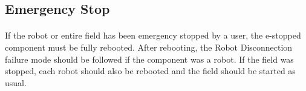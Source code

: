 \documentclass[11pt]{article}
\begin{document}
\subsection{Emergency Stop}
\paragraph{}
If the robot or entire field has been emergency stopped by a user, the e-stopped component must be fully rebooted.
After rebooting, the Robot Disconnection failure mode should be followed if the component was a robot.  
If the field was stopped, each robot should also be rebooted and the field should be started as usual.

\clearpage

\printglossary
\printglossary[type=\acronymtype]
\end{document}
